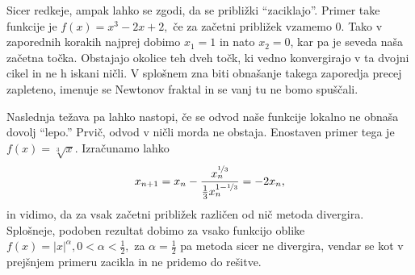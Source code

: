 \documentclass[12pt,a4paper]{amsart}
\theoremstyle{definition} %
\theoremstyle{plain} %
\begin{document}
Sicer redkeje, ampak lahko se zgodi, da se približki "`zaciklajo"'. Primer take funkcije je $f(x) = x^3 - 2x + 2,$ če za začetni približek vzamemo 0. Tako v zaporednih korakih najprej dobimo
$x_{1} = 1$ in nato $x_{2} = 0$, kar pa je seveda naša začetna točka. Obstajajo okolice teh dveh točk, ki vedno konvergirajo v ta dvojni cikel in ne h iskani ničli. V splošnem 
zna biti obnašanje takega zaporedja precej zapleteno, imenuje se Newtonov fraktal in se vanj tu ne bomo spuščali.

Naslednja težava pa lahko nastopi, če se odvod naše funkcije lokalno ne obnaša dovolj "`lepo."' Prvič, odvod v ničli morda ne obstaja. Enostaven primer tega je 
$f(x) = \sqrt[3]{x}.$ Izračunamo lahko
\[
    x_{n+1} = x_{n} - \frac{x_{n} ^ {\nicefrac{1}{3}}}{\frac{1}{3}x_{n}^{1 - \nicefrac{1}{3}}} = -2x_{n},
\]
in vidimo, da za vsak začetni približek različen od nič metoda divergira. Splošneje, podoben rezultat dobimo za vsako funkcijo oblike $f(x) = \lvert x \rvert^{\alpha}, 0 < \alpha < \frac{1}{2},$
za $\alpha = \frac{1}{2}$ pa metoda sicer ne divergira, vendar se kot v prejšnjem primeru zacikla in ne pridemo do rešitve.
\end{document}
